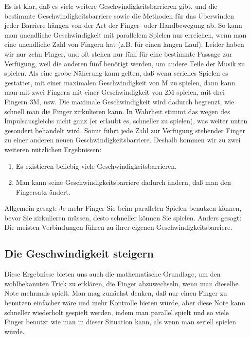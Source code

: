 Es ist klar, daß es viele weitere Geschwindigkeitsbarrieren gibt, und die bestimmte Geschwindigkeitsbarriere sowie die Methoden für das Überwinden jeder Barriere hängen von der Art der Finger- oder Handbewegung ab.
So kann man unendliche Geschwindigkeit mit parallelem Spielen nur erreichen, wenn man eine unendliche Zahl von Fingern hat (z.B. für einen langen Lauf).
Leider haben wir nur zehn Finger, und oft stehen nur fünf für eine bestimmte Passage zur Verfügung, weil die anderen fünf benötigt werden, um andere Teile der Musik zu spielen.
Als eine grobe Näherung kann gelten, daß wenn serielles Spielen es gestattet, mit einer maximalen Geschwindigkeit von M zu spielen, dann kann man mit zwei Fingern mit einer Geschwindigkeit von 2M spielen, mit drei Fingern 3M, usw.
Die maximale Geschwindigkeit wird dadurch begrenzt, wie schnell man die Finger zirkulieren kann.
In Wahrheit stimmt das wegen des Impulsausgleichs nicht ganz (er erlaubt es, schneller zu spielen), was weiter unten gesondert behandelt wird.
Somit führt jede Zahl zur Verfügung stehender Finger zu einer anderen neuen Geschwindigkeitsbarriere.
Deshalb kommen wir zu zwei weiteren nützlichen Ergebnissen: 

\begin{enumerate} 
 \item Es existieren beliebig viele Geschwindigkeitsbarrieren.
 \item Man kann seine Geschwindigkeitsbarriere dadurch ändern, daß man den Fingersatz ändert.
 \end{enumerate}
Allgemein gesagt: Je mehr Finger Sie beim parallelen Spielen benutzen können, bevor Sie zirkulieren müssen, desto schneller können Sie spielen.
Anders gesagt: Die meisten Verbindungen führen zu ihrer eigenen Geschwindigkeitsbarriere.


\subsection{Die Geschwindigkeit steigern}\hypertarget{c1iv2c}{}

Diese Ergebnisse bieten uns auch die mathematische Grundlage, um den wohlbekannten Trick zu erklären, die Finger abzuwechseln, wenn man dieselbe Note mehrmals spielt.
Man mag zunächst denken, daß nur einen Finger zu benutzen einfacher wäre und mehr Kontrolle bieten würde, aber diese Note kann schneller wiederholt gespielt werden, indem man parallel spielt und so viele Finger benutzt wie man in dieser Situation kann, als wenn man seriell spielen würde.

